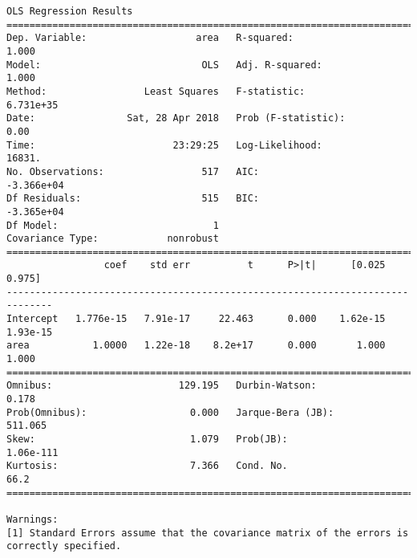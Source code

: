 \documentclass[11pt]{article}
\begin{document}
\begin{Verbatim}[commandchars=\\\{\}]
                            OLS Regression Results                            
==============================================================================
Dep. Variable:                   area   R-squared:                       1.000
Model:                            OLS   Adj. R-squared:                  1.000
Method:                 Least Squares   F-statistic:                 6.731e+35
Date:                Sat, 28 Apr 2018   Prob (F-statistic):               0.00
Time:                        23:29:25   Log-Likelihood:                 16831.
No. Observations:                 517   AIC:                        -3.366e+04
Df Residuals:                     515   BIC:                        -3.365e+04
Df Model:                           1                                         
Covariance Type:            nonrobust                                         
==============================================================================
                 coef    std err          t      P>|t|      [0.025      0.975]
------------------------------------------------------------------------------
Intercept   1.776e-15   7.91e-17     22.463      0.000    1.62e-15    1.93e-15
area           1.0000   1.22e-18    8.2e+17      0.000       1.000       1.000
==============================================================================
Omnibus:                      129.195   Durbin-Watson:                   0.178
Prob(Omnibus):                  0.000   Jarque-Bera (JB):              511.065
Skew:                           1.079   Prob(JB):                    1.06e-111
Kurtosis:                       7.366   Cond. No.                         66.2
==============================================================================

Warnings:
[1] Standard Errors assume that the covariance matrix of the errors is correctly specified.



\end{Verbatim}
\end{document}
